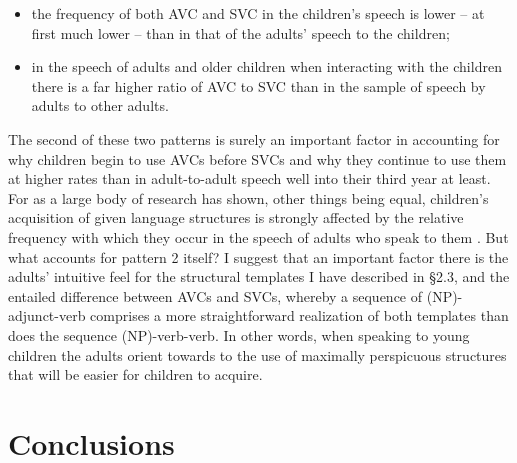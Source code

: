 \documentclass[output=paper]{langsci/langscibook}
\begin{document}
  
\begin{itemize}
\item the frequency of both AVC and SVC in the children’s speech is lower – at first much lower – than in that of the adults’ speech to the children;
\item in the speech of adults and older children when interacting with the children there is a far higher ratio of AVC to SVC than in the sample of speech by adults to other adults.
\end{itemize}

The second of these two patterns is surely an important factor in accounting for why children begin to use AVCs before SVCs and why they continue to use them at higher rates than in adult-to-adult speech well into their third year at least. For as a large body of research has shown, other things being equal,  children’s acquisition of given language structures is strongly affected by the relative frequency with which they occur in the speech of adults who speak to them \citep{Lieven2010,Ambridge2011}. But what accounts for pattern 2 itself? I suggest that an important factor there is the adults’ intuitive feel for the structural templates I have described in §2.3, and the entailed difference between AVCs and SVCs, whereby a sequence of (NP)-adjunct-verb comprises a more straightforward realization of both templates than does the sequence (NP)-verb-verb. In other words, when speaking to young children the adults orient towards to the use of maximally perspicuous structures that will be easier for children to acquire. 

\section{Conclusions}
\end{document}
